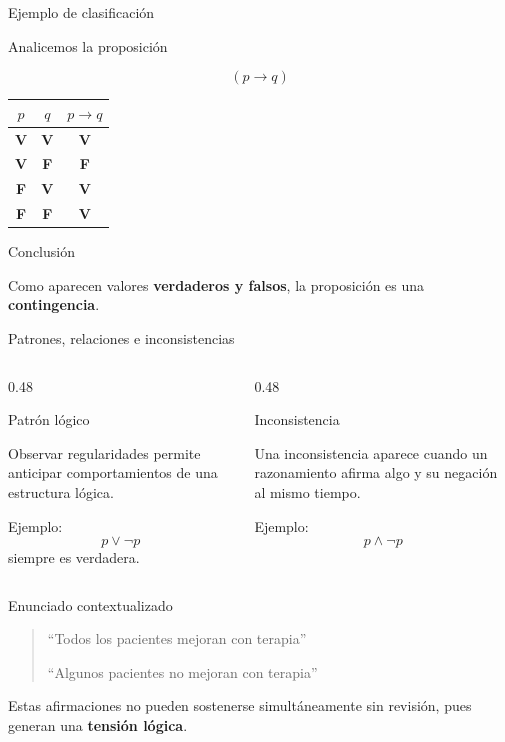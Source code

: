 \documentclass[aspectratio=169,10pt,handout]{beamer}
\newcommand{\destacado}[1]{\textcolor{PsyPrimary}{\textbf{#1}}}
\newcommand{\clave}[1]{\textcolor{PsyAccent}{\textbf{#1}}}
\newcommand{\verdadero}{\textcolor{PsyGood}{\textbf{V}}}
\newcommand{\falso}{\textcolor{PsyBad}{\textbf{F}}}
\newenvironment{IdeaClave}[1]
{
	\begin{block}{#1}
		\justifying
	}
	{
	\end{block}
}
\newenvironment{Alerta}[1]
{
	\begin{alertblock}{#1}
		\justifying
	}
	{
	\end{alertblock}
}
\newenvironment{Ejemplo}[1]
{
	\begin{exampleblock}{#1}
		\justifying
	}
	{
	\end{exampleblock}
}
\begin{document}
	\begin{frame}{Ejemplo de clasificación}
		\begin{Ejemplo}{Analicemos la proposición}
			\[
			(p \to q)
			\]
		\end{Ejemplo}
		
		\begin{center}
			\renewcommand{\arraystretch}{1.4}
			\begin{tabular}{c c c}
				\toprule
				$p$ & $q$ & $p \to q$ \\
				\midrule
				\verdadero & \verdadero & \verdadero \\
				\verdadero & \falso     & \falso \\
				\falso     & \verdadero & \verdadero \\
				\falso     & \falso     & \verdadero \\
				\bottomrule
			\end{tabular}
		\end{center}
		
		\pause
		
		\begin{Alerta}{Conclusión}
			Como aparecen valores \destacado{verdaderos y falsos}, la proposición es una \clave{contingencia}.
		\end{Alerta}
	\end{frame}
	
	\begin{frame}{Patrones, relaciones e inconsistencias}
		\begin{columns}[T,totalwidth=\textwidth]
			\begin{column}{0.48\textwidth}
				\begin{IdeaClave}{Patrón lógico}
					Observar regularidades permite anticipar comportamientos de una estructura lógica.
					
					Ejemplo:
					\[
					p \lor \neg p
					\]
					siempre es verdadera.
				\end{IdeaClave}
			\end{column}
			\begin{column}{0.48\textwidth}
				\begin{Alerta}{Inconsistencia}
					Una inconsistencia aparece cuando un razonamiento afirma algo y su negación al mismo tiempo.
					
					Ejemplo:
					\[
					p \land \neg p
					\]
				\end{Alerta}
			\end{column}
		\end{columns}
		
		\pause
		
		\begin{Ejemplo}{Enunciado contextualizado}
			\begin{quote}
				``Todos los pacientes mejoran con terapia''
				
				``Algunos pacientes no mejoran con terapia''
			\end{quote}
			Estas afirmaciones no pueden sostenerse simultáneamente sin revisión, pues generan una \destacado{tensión lógica}.
		\end{Ejemplo}
	\end{frame}
	
\end{document}
